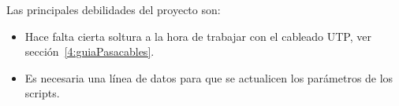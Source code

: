 Las principales debilidades del proyecto son:

\begin{itemize}
\tightlist
\item
    Hace falta cierta soltura a la hora de trabajar con el cableado UTP, ver sección~\ref{4:guiaPasacables}.
\item
    Es necesaria una línea de datos para que se actualicen los parámetros de los scripts.

\end{itemize}

